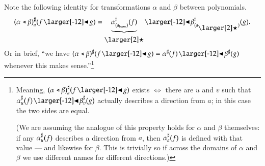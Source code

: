 \documentclass{amsart}
\begin{document}
\iffalse
  Suppose we have polynomials $P$ and $Q$ and the following
  structure relating them.
  \begin{itemize}
  \item A function $\alpha_1$ from the positions of $P$ to the
    positions of $Q$.
  \item For each position $a$ in $P$, a function $\alpha^\sharp_a$ from the
    directions of $\alpha(a)$ back to the directions of $a$.
  \end{itemize}
  This is called a \emph{transformation} from $P$ to $Q$ (written
  $\alpha: P \to Q$).

  We think of this as a way of replacing each corolla from $P$ with a
  a corolla from $Q$.


  The \emph{composite} of transformations $\alpha : P \to Q$ and
  $\beta : Q \to R$, denoted $\alpha \fatsemi \beta : P \to R$,
  is defined by
  \[
    \posmap{(\alpha \fatsemi \beta)}{a} = \posmap{\beta}{\posmap{\alpha}{a}}
    \quad \text{ and } \quad
    \dirmap{(\alpha \fatsemi \beta)}{a}{f} =
    \dirmap{\alpha}{a}{\dirmap{\beta}{\posmap{\alpha}{a}}{f}},
  \] i.e., we do the corolla replacements in order.


  This definition of transformation plays well with the substitution
  product.

\fi

Note the following identity for transformations $\alpha$ and $\beta$
between polynomials.
\[\dirmap{(\alpha \sub \beta)}{a}{f \subd g} = \underbrace{\dirmap{\alpha}{(a_\base)}{f}}_{\backref}
  \subd \dirmap{\beta}{(a_{\backref})}{g}.\] Or in brief, ``we have
$(\alpha \sub \beta)^\sharp(f \subd g) = \alpha^\sharp(f)
\subd\beta^\sharp(g)$ whenever this makes sense.''\footnote{Meaning,
  ${\dirmap{(\alpha \sub \beta)}{a}{f \subd g}}$ exists $\iff$ there are
  $u$ and $v$ such that
  ${\dirmap{\alpha}{u}{f} \subd \dirmap{\beta}{v}{g}}$ actually
  describes a direction from $a$; in this case the two sides are
  equal.
  
  (We are assuming the analogue of this property holds for $\alpha$
  and $\beta$ themselves: if any ${\alpha}^\sharp_{u}(f)$ describes a
  direction from $a$, then ${\alpha}^\sharp_{a}(f)$ is defined with
  that value --- and likewise for $\beta$. This is trivially so if
  across the domains of $\alpha$ and $\beta$ we use different names
  for different directions.)
  
  \iffalse
    Indeed, the directions from $a$ are of the form $f' \subd g'$,
    where $f'$ is a direction from $a_\base$ and $g'$ is a direction
    from $a_{f'}$. Hence if the expression
    $\dirmap{\alpha}{x}{f} \subd dirmap{\beta}{y}{g}$ is to describe a
    direction from $a$, then $x$ should be $a_\base$, and $y$ should
    be $a_{f'}$.
  \fi
}
\end{document}
